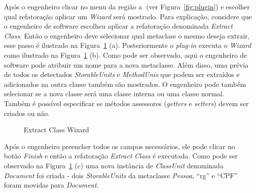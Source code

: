 Após o engenheiro clicar no menu da região \textcircled{a} (ver Figura~\ref{fig:plugin}) e escolher qual refatoração aplicar um \textit{Wizard} será mostrado. Para explicação, considere que o engenheiro de software escolheu aplicar a refatoração denominada \textit{Extract Class}. Então o engenheiro deve selecionar qual metaclass o mesmo deseja extrair, esse passo é ilustrado na Figura~\ref{fig:wizard} (a). Posteriormente o \textit{plug-in} executa o \textit{Wizard} como ilustrado na Figura~\ref{fig:wizard} (b). Como pode ser observado, aqui o engenheiro de software pode atribuir um nome para a nova metaclasse. Além disso, uma prévia de todos os detectados \textit{StorableUnits} e \textit{MethodUnis} que podem ser extraídos e adicionados na outra classe também são mostrados. O engenheiro pode também selecionar se a nova classe será uma classe interna ou uma classe normal. Também é possível especificar se métodos assessores (\textit{getters} e \textit{setters}) devem ser criados ou não. 

\begin{figure}[!h]
 \centering
\caption{Extract Class Wizard}
 \label{fig:wizard}
\end{figure}

Após o engenheiro preencher todos os campos necessários, ele pode clicar no botão \textit{Finish} e então a refatoração \textit{Extract Class} é executada. Como pode ser observado na Figura~\ref{fig:wizard} (c) uma nova instância de \textit{ClassUnit} denominada \textit{Document} foi criada - dois \textit{StorableUnits} da metaclasse \textit{Pessoa}, ``rg'' e ``CPF'' foram movidas para \textit{Document}.


